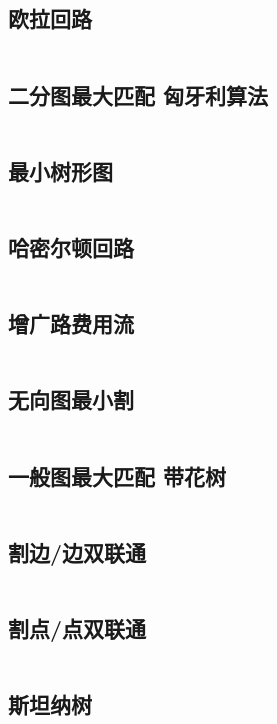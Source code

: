 \documentclass[titlepage,landscape,a4paper,10pt]{article}
\begin{document}
\begin{multicols}{2}
\begin{spacing}{0.8}
\subsection{欧拉回路}
\inputminted{cpp}{Graph/欧拉回路.cpp}

\subsection{二分图最大匹配 匈牙利算法}
\inputminted{cpp}{Graph/匈牙利算法.cpp}

\subsection{最小树形图}
\inputminted{cpp}{Graph/朱刘.cpp}

\subsection{哈密尔顿回路}
\inputminted{cpp}{Graph/哈密尔顿回路.cpp}

\subsection{增广路费用流}
\inputminted{cpp}{Graph/增广路费用流.cpp}

\subsection{无向图最小割}
\inputminted{cpp}{Graph/无向图最小割.cpp}

\subsection{一般图最大匹配 带花树}
\inputminted{cpp}{Graph/带花树.cpp}

\subsection{割边/边双联通}
\inputminted{cpp}{Graph/割边.cpp}

\subsection{割点/点双联通}
\inputminted{cpp}{Graph/割点.cpp}

\subsection{斯坦纳树}
\inputminted{cpp}{Graph/斯坦纳树.cpp}


\end{spacing}
\end{multicols}
\end{document}

